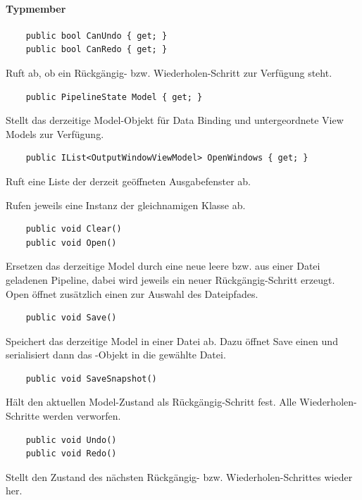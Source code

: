 \paragraph{Typmember}
\begin{itemize}

	\begin{verbatim}
	public bool CanUndo { get; }
	public bool CanRedo { get; }
	\end{verbatim}
	Ruft ab, ob ein Rückgängig- bzw. Wiederholen-Schritt zur Verfügung steht.

	\INPC
	\begin{verbatim}
	public PipelineState Model { get; }
	\end{verbatim}
	Stellt das derzeitige Model-Objekt für Data Binding und untergeordnete View Models zur Verfügung.

	\begin{verbatim}
	public IList<OutputWindowViewModel> OpenWindows { get; }
	\end{verbatim}
	Ruft eine Liste der derzeit geöffneten Ausgabefenster ab.


	Rufen jeweils eine Instanz der gleichnamigen Klasse ab.

	\begin{verbatim}
	public void Clear()
	public void Open()
	\end{verbatim}
	Ersetzen das derzeitige Model durch eine neue leere bzw. aus einer Datei geladenen Pipeline, dabei wird jeweils ein neuer Rückgängig-Schritt erzeugt. Open öffnet zusätzlich einen  zur Auswahl des Dateipfades.

	\begin{verbatim}
	public void Save()
	\end{verbatim}
	Speichert das derzeitige Model in einer Datei ab. Dazu öffnet Save einen  und serialisiert dann das -Objekt in die gewählte Datei.

	\begin{verbatim}
	public void SaveSnapshot()
	\end{verbatim}
	Hält den aktuellen Model-Zustand als Rückgängig-Schritt fest. Alle Wiederholen-Schritte werden verworfen.

	\begin{verbatim}
	public void Undo()
	public void Redo()
	\end{verbatim}
	Stellt den Zustand des nächsten Rückgängig- bzw. Wiederholen-Schrittes wieder her.

\end{itemize}


